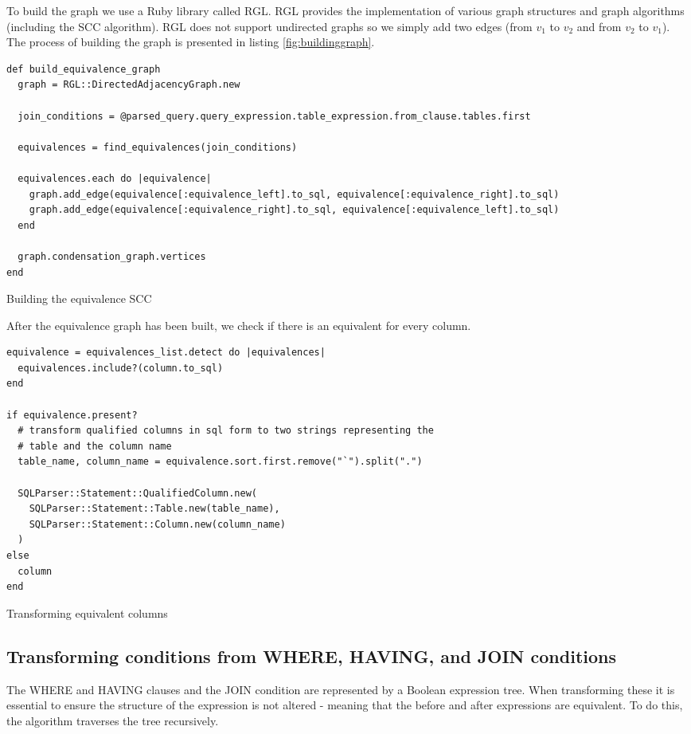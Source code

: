 To build the graph we use a Ruby library called RGL. RGL provides the implementation of various graph structures and graph algorithms (including the SCC algorithm). RGL does not support undirected graphs so we simply add two edges (from $v_1$ to $v_2$ and from $v_2$ to $v_1$). The process of building the graph is presented in listing \ref{fig:buildinggraph}.

\begin{code}
\begin{verbatim}
def build_equivalence_graph
  graph = RGL::DirectedAdjacencyGraph.new

  join_conditions = @parsed_query.query_expression.table_expression.from_clause.tables.first

  equivalences = find_equivalences(join_conditions)

  equivalences.each do |equivalence|
    graph.add_edge(equivalence[:equivalence_left].to_sql, equivalence[:equivalence_right].to_sql)
    graph.add_edge(equivalence[:equivalence_right].to_sql, equivalence[:equivalence_left].to_sql)
  end

  graph.condensation_graph.vertices
end
\end{verbatim}
\caption{Building the equivalence SCC}
\label{fig:buildinggraph}
\end{code}

After the equivalence graph has been built, we check if there is an equivalent for every column.

\begin{code}
\begin{verbatim}
equivalence = equivalences_list.detect do |equivalences|
  equivalences.include?(column.to_sql)
end

if equivalence.present?
  # transform qualified columns in sql form to two strings representing the
  # table and the column name
  table_name, column_name = equivalence.sort.first.remove("`").split(".")

  SQLParser::Statement::QualifiedColumn.new(
    SQLParser::Statement::Table.new(table_name),
    SQLParser::Statement::Column.new(column_name)
  )
else
  column
end
\end{verbatim}
\caption{Transforming equivalent columns}
\end{code}

\subsection{Transforming conditions from WHERE, HAVING, and JOIN conditions}
The WHERE and HAVING clauses and the JOIN condition are represented by a Boolean expression tree. When transforming these it is essential to ensure the structure of the expression is not altered - meaning that the before and after expressions are equivalent. To do this, the algorithm traverses the tree recursively.

